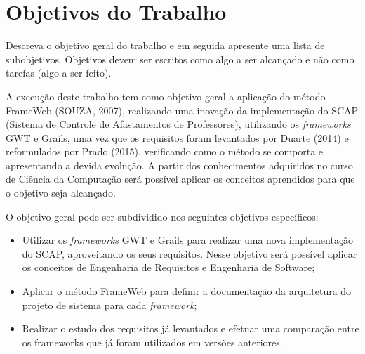 
\section{Objetivos do Trabalho}
\label{sec-objetivos}

Descreva o objetivo geral do trabalho e em seguida apresente uma lista de subobjetivos. Objetivos devem ser escritos como algo a ser alcançado e não como tarefas (algo a ser feito).

A execução deste trabalho tem como objetivo geral a aplicação do método FrameWeb (SOUZA, 2007), realizando uma inovação da implementação do SCAP (Sistema de Controle de Afastamentos de Professores), utilizando os \textit{frameworks} GWT e Grails, uma vez que os requisitos foram levantados por Duarte (2014) e reformulados por Prado (2015), verificando como o método se comporta e apresentando a devida evolução. A partir dos conhecimentos adquiridos no curso de Ciência da Computação será possível aplicar os conceitos aprendidos para que o objetivo seja alcançado.

O objetivo geral pode ser subdividido nos seguintes objetivos específicos:

\begin{itemize}
	\item Utilizar os \textit{frameworks} GWT e Grails para realizar uma nova implementação do SCAP, aproveitando os seus requisitos. Nesse objetivo será possível aplicar os conceitos de Engenharia de Requisitos e Engenharia de Software;
	\item Aplicar o método FrameWeb para definir a documentação da arquitetura do projeto de sistema para cada \textit{framework};
    \item Realizar o estudo dos requisitos já levantados e efetuar uma comparação entre os frameworks que já foram utilizados em versões anteriores.
\end{itemize}
